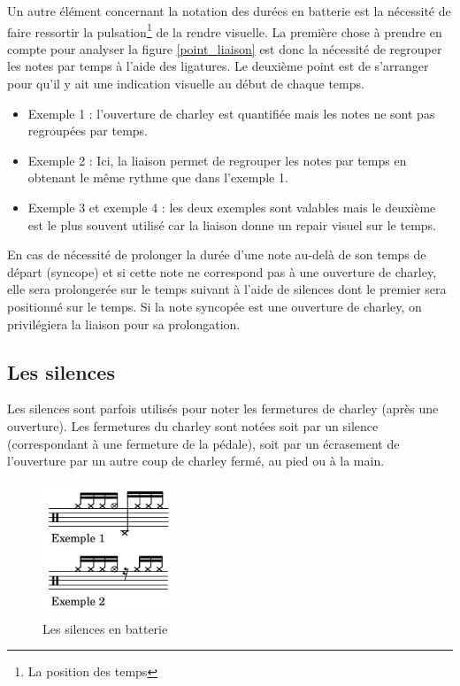 Un autre élément concernant la notation des durées en batterie est la nécessité
de faire ressortir la pulsation\footnote{La position des temps} de la rendre
visuelle. La première chose à prendre en compte pour analyser la figure
\ref{point_liaison} est donc la nécessité de regrouper les notes par temps à
l’aide des ligatures. Le deuxième point est de s’arranger pour qu’il y ait une
indication visuelle au début de chaque temps.

\begin{itemize}
    \item Exemple 1 : l’ouverture de charley est quantifiée mais les notes ne
        sont pas regroupées par temps.
    \item Exemple 2 : Ici, la liaison permet de regrouper les notes par temps
        en obtenant le même rythme que dans l’exemple 1.
    \item Exemple 3 et exemple 4 : les deux exemples sont valables mais le
        deuxième est le plus souvent utilisé car la liaison donne un repair
        visuel sur le temps.\\
\end{itemize}

En cas de nécessité de prolonger la durée d’une note au-delà 
de son temps de départ (syncope) et si cette note ne correspond pas à une
ouverture de charley, elle sera prolongerée sur le temps suivant à l’aide de
silences dont le premier sera positionné sur le temps. Si la note syncopée est
une ouverture de charley, on privilégiera la liaison pour sa prolongation.

\subsection*{Les silences}
Les silences sont parfois utilisés pour noter les fermetures de charley (après
une ouverture). Les fermetures du charley sont notées soit par un silence
(correspondant à une fermeture de la pédale), soit par un écrasement de
l’ouverture par un autre coup de charley fermé, au pied ou à la main.

\begin{figure}[h]
	\centering
	\includegraphics[height=40mm, width=40mm]{
    z_images/3_methodes/0_notation_de_la_batterie/5_silence_joue.png}
	\caption{Les silences en batterie}
	\label{silence joue}
\end{figure}

